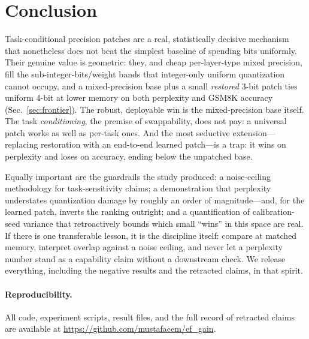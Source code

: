 \documentclass[11pt]{article}
\newcommand{\bpw}{bits/weight}
\begin{document}
\section{Conclusion}
Task-conditional precision patches are a real, statistically decisive mechanism
that nonetheless does not beat the simplest baseline of spending bits
uniformly. Their genuine value is geometric: they, and cheap per-layer-type
mixed precision, fill the sub-integer-\bpw{} bands that integer-only uniform
quantization cannot occupy, and a mixed-precision base plus a small
\emph{restored} 3-bit patch ties uniform 4-bit at lower memory on both
perplexity and GSM8K accuracy (Sec.~\ref{sec:frontier}). The robust, deployable
win is the mixed-precision base itself. The task \emph{conditioning}, the
premise of swappability, does not pay: a universal patch works as well as
per-task ones. And the most seductive extension---replacing restoration with an
end-to-end learned patch---is a trap: it wins on perplexity and loses on
accuracy, ending below the unpatched base.

Equally important are the guardrails the study produced: a noise-ceiling
methodology for task-sensitivity claims; a demonstration that perplexity
understates quantization damage by roughly an order of magnitude---and, for the
learned patch, inverts the ranking outright; and a quantification of
calibration-seed variance that retroactively bounds which small ``wins'' in
this space are real. If there is one transferable lesson, it is the discipline
itself: compare at matched memory, interpret overlap against a noise ceiling,
and never let a perplexity number stand as a capability claim without a
downstream check. We release everything, including the negative results and the
retracted claims, in that spirit.

\paragraph{Reproducibility.} All code, experiment scripts, result files, and
the full record of retracted claims are available at
\url{https://github.com/mustafacem/ef_gain}.
\end{document}
